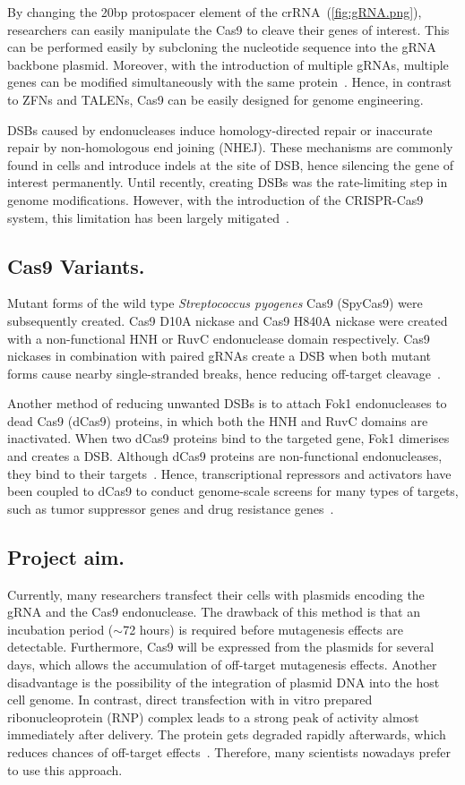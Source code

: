 \documentclass[11pt]{article}
\begin{document}
By changing the 20bp protospacer element of the crRNA~(\autoref{fig:gRNA.png}), researchers can easily manipulate the Cas9 to cleave their genes of interest. This can be performed easily by subcloning the nucleotide sequence into the gRNA backbone plasmid. Moreover, with the introduction of multiple gRNAs, multiple genes can be modified simultaneously with the same protein~\citep{Jinek2012a}. Hence, in contrast to ZFNs and TALENs, Cas9 can be easily designed for genome engineering.

DSBs caused by endonucleases induce homology-directed repair or inaccurate repair by non-homologous end joining (NHEJ). These mechanisms are commonly found in cells and introduce indels at the site of DSB, hence silencing the gene of interest permanently. Until recently, creating DSBs was the rate-limiting step in genome modifications. However, with the introduction of the CRISPR-Cas9 system, this limitation has been largely mitigated~\citep{Chen2015a, Ramalingam2013}. 

\subsection{Cas9 Variants.}
Mutant forms of the wild type \textit{Streptococcus pyogenes} Cas9 (SpyCas9) were subsequently created. Cas9 D10A nickase and Cas9 H840A nickase were created with a non-functional HNH or RuvC endonuclease domain  respectively. Cas9 nickases in combination with paired gRNAs create a DSB when both mutant forms cause nearby single-stranded breaks, hence reducing off-target cleavage~\citep{Ran2013}. 

Another method of reducing unwanted DSBs is to attach Fok1 endonucleases to dead Cas9 (dCas9) proteins, in which both the HNH and RuvC domains are inactivated. When two dCas9 proteins bind to the targeted gene, Fok1 dimerises and creates a DSB. Although dCas9 proteins are non-functional endonucleases, they bind to their targets~\citep{Guilinger2014c}. Hence, transcriptional repressors and activators have been coupled to dCas9 to conduct genome-scale screens for many types of targets, such as tumor suppressor genes and drug resistance genes~\citep{Gilbert2014, Shalem2015}. 

\subsection{Project aim.}
Currently, many researchers transfect their cells with plasmids encoding the gRNA and the Cas9 endonuclease. The drawback of this method is that an incubation period ($\sim$72 hours) is required before mutagenesis effects are detectable. Furthermore, Cas9 will be expressed from the plasmids for several days, which allows the accumulation of off-target mutagenesis effects. Another disadvantage is the possibility of the integration of plasmid DNA into the host cell genome. In contrast, direct transfection with in vitro prepared ribonucleoprotein (RNP) complex leads to a strong peak of activity almost immediately after delivery. The protein gets degraded rapidly afterwards, which reduces chances of off-target effects~\citep{Kim2014}. Therefore, many scientists nowadays prefer to use this approach. 
\end{document}

